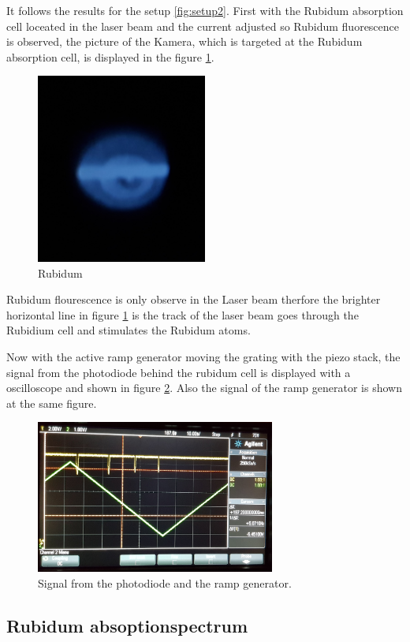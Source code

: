 It follows the results for the setup \ref{fig:setup2}.
First with the Rubidum absorption cell loceated in the laser beam
and the current adjusted so Rubidum fluorescence is observed, the picture of the
Kamera, which is targeted at the
Rubidum absorption cell, is
displayed in the figure \ref{fig:Floures}.

\begin{figure}
  \centering
  \includegraphics[width = 0.5\textwidth]{figures/Rb_leuchten.jpg}
  \caption{Rubidum }
  \label{fig:Floures}
\end{figure}

Rubidum flourescence is only observe in the Laser beam therfore
the brighter horizontal line
in figure \ref{fig:Floures}
is the track of the laser beam
goes through the Rubidium cell and stimulates the Rubidum atoms.

Now with the active ramp generator moving the grating with the piezo stack,
the signal from the photodiode behind the rubidum cell
is displayed with a
oscilloscope and shown in figure \ref{fig:ramp}.
Also the signal of the ramp generator is shown at the same
figure.

\begin{figure}
  \centering
  \includegraphics[width = 0.7\textwidth]{figures/Ramp.jpg}
  \caption{Signal from the photodiode and the ramp generator.}
  \label{fig:ramp}
\end{figure}




\subsection{Rubidum absoptionspectrum}
\label{sec:ru_absoption}

